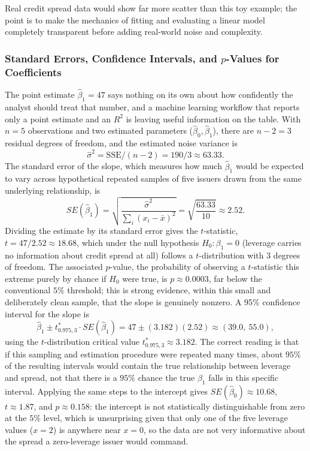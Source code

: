 \documentclass[../ai_in_finance]{subfiles}
\begin{document}
Real credit spread data would show far more scatter than this toy example; the point is to make the mechanics of fitting and evaluating a linear model completely transparent before adding real-world noise and complexity.

\subsubsection*{Standard Errors, Confidence Intervals, and $p$-Values for Coefficients}
\label{sec:regression-inference}

The point estimate $\hat\beta_1 = 47$ says nothing on its own about how confidently the analyst should treat that number, and a machine learning workflow that reports only a point estimate and an $R^2$ is leaving useful information on the table. With $n=5$ observations and two estimated parameters ($\hat\beta_0,\hat\beta_1$), there are $n-2=3$ residual degrees of freedom, and the estimated noise variance is
$$\hat\sigma^2 = \text{SSE}/(n-2) = 190/3 \approx 63.33.$$
The standard error of the slope, which measures how much $\hat\beta_1$ would be expected to vary across hypothetical repeated samples of five issuers drawn from the same underlying relationship, is
\begin{equation*}
SE(\hat\beta_1) = \sqrt{\frac{\hat\sigma^2}{\sum_i (x_i-\bar x)^2}} = \sqrt{\frac{63.33}{10}} \approx 2.52.
\end{equation*}
Dividing the estimate by its standard error gives the $t$-statistic, $t = 47/2.52 \approx 18.68$, which under the null hypothesis $H_0: \beta_1 = 0$ (leverage carries no information about credit spread at all) follows a $t$-distribution with $3$ degrees of freedom. The associated $p$-value, the probability of observing a $t$-statistic this extreme purely by chance if $H_0$ were true, is $p \approx 0.0003$, far below the conventional $5\%$ threshold; this is strong evidence, within this small and deliberately clean sample, that the slope is genuinely nonzero. A 95\% confidence interval for the slope is
\begin{equation*}
\hat\beta_1 \pm t^*_{0.975,3}\cdot SE(\hat\beta_1) = 47 \pm (3.182)(2.52) \approx (39.0,\ 55.0),
\end{equation*}
using the $t$-distribution critical value $t^*_{0.975,3}\approx 3.182$. The correct reading is that if this sampling and estimation procedure were repeated many times, about $95\%$ of the resulting intervals would contain the true relationship between leverage and spread, not that there is a $95\%$ chance the true $\beta_1$ falls in this specific interval. Applying the same steps to the intercept gives $SE(\hat\beta_0) \approx 10.68$, $t \approx 1.87$, and $p \approx 0.158$: the intercept is not statistically distinguishable from zero at the $5\%$ level, which is unsurprising given that only one of the five leverage values ($x=2$) is anywhere near $x=0$, so the data are not very informative about the spread a zero-leverage issuer would command.
\end{document}
